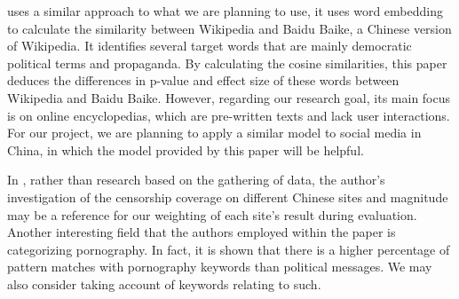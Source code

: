 \citeauthor{10.1145/3442188.3445916} uses a similar approach to what we are planning to use, it uses word embedding to calculate the similarity between Wikipedia and Baidu Baike, a Chinese version of Wikipedia. It identifies several target words that are mainly democratic political terms and propaganda. By calculating the cosine similarities, this paper deduces the differences in p-value and effect size of these words between Wikipedia and Baidu Baike. However, regarding our research goal, its main focus is on online encyclopedias, which are pre-written texts and lack user interactions. For our project, we are planning to apply a similar model to social media in China, in which the model provided by this paper will be helpful.

In \citeauthor{33531}, rather than research based on the gathering of data, the author’s investigation of the censorship coverage on different Chinese sites and magnitude may be a reference for our weighting of each site’s result during evaluation. Another interesting field that the authors employed within the paper is categorizing pornography. In fact, it is shown that there is a higher percentage of pattern matches with pornography keywords than political messages. We may also consider taking account of keywords relating to such.